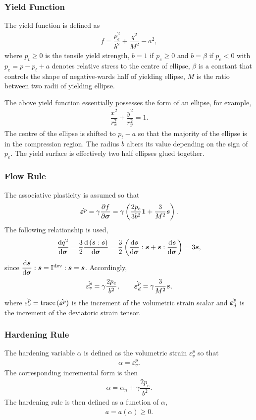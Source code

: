 \subsubsection{Yield Function}
The yield function is defined as
\begin{gather}
f=\dfrac{p_e^2}{b^2}+\dfrac{q^2}{M^2}-a^2,
\end{gather}
where $p_t\geqslant0$ is the tensile yield strength, $b=1$ if $p_e\geqslant0$ and $b=\beta$ if $p_e<0$ with $p_e=p-p_t+a$ denotes relative stress to the centre of ellipse, $\beta$ is a constant that controls the shape of negative-wards half of yielding ellipse, $M$ is the ratio between two radii of yielding ellipse.

The above yield function essentially possesses the form of an ellipse, for example,
\begin{gather*}
\dfrac{x^2}{r_x^2}+\dfrac{y^2}{r_y^2}=1.
\end{gather*}
The centre of the ellipse is shifted to $p_t-a$ so that the majority of the ellipse is in the compression region.
The radius $b$ alters its value depending on the sign of $p_e$.
The yield surface is effectively two half ellipses glued together.
\subsubsection{Flow Rule}
The associative plasticity is assumed so that
\begin{gather}
\dot{\bm{\varepsilon}^p}=\gamma\dfrac{\partial{f}}{\partial{\bm{\sigma}}}=\gamma\left(\dfrac{2p_e}{3b^2}\bm{1}+\dfrac{3}{M^2}\bm{s}\right).
\end{gather}
The following relationship is used,
\begin{gather*}
\dfrac{\mathrm{d}q^2}{\mathrm{d}\bm{\sigma}}=\dfrac{3}{2}\dfrac{\mathrm{d}\left(\bm{s}:\bm{s}\right)}{\mathrm{d}\bm{\sigma}}=\dfrac{3}{2}\left(\dfrac{\mathrm{d}\bm{s}}{\mathrm{d}\bm{\sigma}}:\bm{s}+\bm{s}:\dfrac{\mathrm{d}\bm{s}}{\mathrm{d}\bm{\sigma}}\right)=3\bm{s},
\end{gather*}
since $\dfrac{\mathrm{d}\bm{s}}{\mathrm{d}\bm{\sigma}}:\bm{s}=\mathbb{I}^\text{dev}:\bm{s}=\bm{s}$.
Accordingly,
\begin{gather}
\dot{\varepsilon^p_v}=\gamma\dfrac{2p_e}{b^2},\qquad\dot{\bm{\varepsilon}^p_d}=\gamma\dfrac{3}{M^2}\bm{s},
\end{gather}
where $\dot{\varepsilon^p_v}=\text{trace}\left(\dot{\bm{\varepsilon}^p}\right)$ is the increment of the volumetric strain scalar and $\dot{\bm{\varepsilon}^p_d}$ is the increment of the deviatoric strain tensor.
\subsubsection{Hardening Rule}
The hardening variable $\alpha$ is defined as the volumetric strain $\varepsilon^p_v$ so that
\begin{gather}
\alpha=\varepsilon^p_v.
\end{gather}
The corresponding incremental form is then
\begin{gather}
\alpha=\alpha_n+\gamma\dfrac{2p_e}{b^2}.
\end{gather}
The hardening rule is then defined as a function of $\alpha$,
\begin{gather}
a=a\left(\alpha\right)\geqslant0.
\end{gather}

